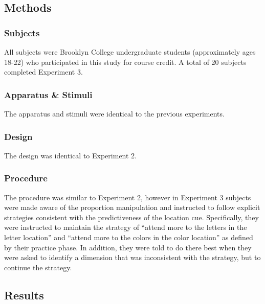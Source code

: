 \documentclass[]{DissertateCUNY}
\begin{document}
\hypertarget{methods-2}{%
\subsection{Methods}\label{methods-2}}

\hypertarget{subjects-2}{%
\subsubsection{Subjects}\label{subjects-2}}

All subjects were Brooklyn College undergraduate students (approximately
ages 18-22) who participated in this study for course credit. A total of
20 subjects completed Experiment 3.

\hypertarget{apparatus-stimuli-2}{%
\subsubsection{Apparatus \& Stimuli}\label{apparatus-stimuli-2}}

The apparatus and stimuli were identical to the previous experiments.

\hypertarget{design-2}{%
\subsubsection{Design}\label{design-2}}

The design was identical to Experiment 2.

\hypertarget{procedure-2}{%
\subsubsection{Procedure}\label{procedure-2}}

The procedure was similar to Experiment 2, however in Experiment 3
subjects were made aware of the proportion manipulation and instructed
to follow explicit strategies consistent with the predictiveness of the
location cue. Specifically, they were instructed to maintain the
strategy of ``attend more to the letters in the letter location'' and
``attend more to the colors in the color location'' as defined by their
practice phase. In addition, they were told to do there best when they
were asked to identify a dimension that was inconsistent with the
strategy, but to continue the strategy.

\hypertarget{results-2}{%
\subsection{Results}\label{results-2}}
\end{document}
